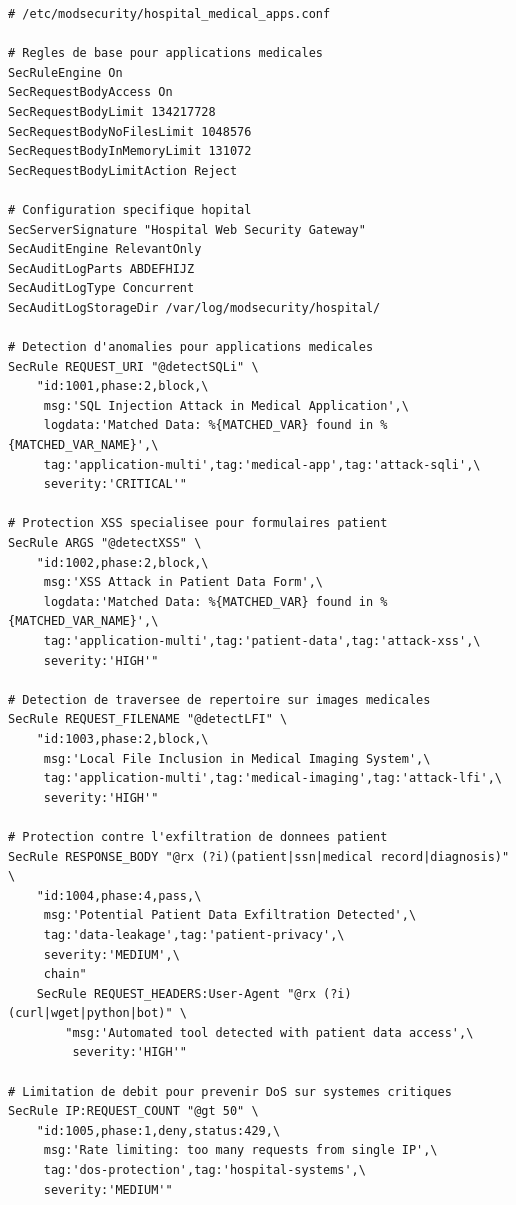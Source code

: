 \begin{lstlisting}[caption=Configuration ModSecurity pour applications medicales]
# /etc/modsecurity/hospital_medical_apps.conf

# Regles de base pour applications medicales
SecRuleEngine On
SecRequestBodyAccess On
SecRequestBodyLimit 134217728
SecRequestBodyNoFilesLimit 1048576
SecRequestBodyInMemoryLimit 131072
SecRequestBodyLimitAction Reject

# Configuration specifique hopital
SecServerSignature "Hospital Web Security Gateway"
SecAuditEngine RelevantOnly
SecAuditLogParts ABDEFHIJZ
SecAuditLogType Concurrent
SecAuditLogStorageDir /var/log/modsecurity/hospital/

# Detection d'anomalies pour applications medicales
SecRule REQUEST_URI "@detectSQLi" \
    "id:1001,phase:2,block,\
     msg:'SQL Injection Attack in Medical Application',\
     logdata:'Matched Data: %{MATCHED_VAR} found in %{MATCHED_VAR_NAME}',\
     tag:'application-multi',tag:'medical-app',tag:'attack-sqli',\
     severity:'CRITICAL'"

# Protection XSS specialisee pour formulaires patient
SecRule ARGS "@detectXSS" \
    "id:1002,phase:2,block,\
     msg:'XSS Attack in Patient Data Form',\
     logdata:'Matched Data: %{MATCHED_VAR} found in %{MATCHED_VAR_NAME}',\
     tag:'application-multi',tag:'patient-data',tag:'attack-xss',\
     severity:'HIGH'"

# Detection de traversee de repertoire sur images medicales
SecRule REQUEST_FILENAME "@detectLFI" \
    "id:1003,phase:2,block,\
     msg:'Local File Inclusion in Medical Imaging System',\
     tag:'application-multi',tag:'medical-imaging',tag:'attack-lfi',\
     severity:'HIGH'"

# Protection contre l'exfiltration de donnees patient
SecRule RESPONSE_BODY "@rx (?i)(patient|ssn|medical record|diagnosis)" \
    "id:1004,phase:4,pass,\
     msg:'Potential Patient Data Exfiltration Detected',\
     tag:'data-leakage',tag:'patient-privacy',\
     severity:'MEDIUM',\
     chain"
    SecRule REQUEST_HEADERS:User-Agent "@rx (?i)(curl|wget|python|bot)" \
        "msg:'Automated tool detected with patient data access',\
         severity:'HIGH'"

# Limitation de debit pour prevenir DoS sur systemes critiques
SecRule IP:REQUEST_COUNT "@gt 50" \
    "id:1005,phase:1,deny,status:429,\
     msg:'Rate limiting: too many requests from single IP',\
     tag:'dos-protection',tag:'hospital-systems',\
     severity:'MEDIUM'"


\end{lstlisting}
